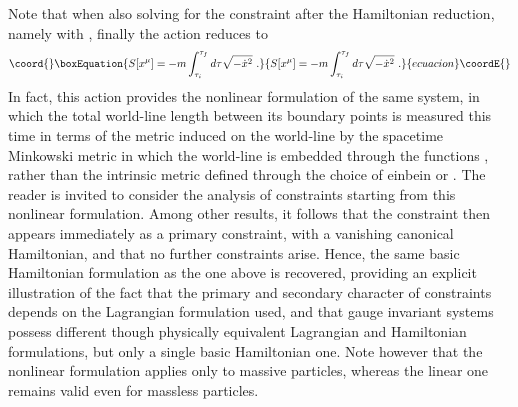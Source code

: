 \documentclass[a4paper,11pt]{article}
\begin{document}
Note that when also solving for the constraint \coordHE{} after
the Hamiltonian reduction, namely with \coordHE{}, finally
the action reduces to
\begin{equation}\coord{}\boxEquation{
S[x^\mu]=-m\int_{\tau_i}^{\tau_f}d\tau\sqrt{-\dot{x}^2}\ .
}{
S[x^\mu]=-m\int_{\tau_i}^{\tau_f}d\tau\sqrt{-\dot{x}^2}\ .
}{ecuacion}\coordE{}\end{equation}
In fact, this action provides the nonlinear formulation of the same system,
in which the total world-line length between its boundary points is measured
this time in terms of the metric induced on the world-line by the
spacetime Minkowski metric in which the world-line is embedded through the
functions \coordHE{}, rather than the intrinsic metric defined through
the choice of einbein \coordHE{} or \myHighlight{$\lambda(\tau)$}\coordHE{}. The reader is invited
to consider the analysis of constraints star\-ting from this nonlinear
formulation. Among other results, it follows that the constraint
\coordHE{} then appears immediately as a primary constraint,
with a vanishing canonical Hamiltonian, and that no further constraints arise.
Hence, the same basic Hamiltonian formulation as the one above is
recovered, providing an explicit illustration of the fact that the primary
and secondary character of constraints depends on the Lagrangian formulation
used, and that gauge invariant systems possess different though physically
equivalent Lagrangian and Hamiltonian formulations, but only a single basic
Hamiltonian one. Note however that the nonlinear formulation applies
only to massive particles, whereas the linear one remains valid even for
massless particles.
\end{document}
